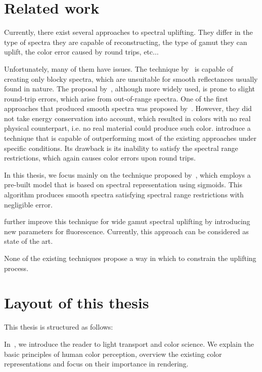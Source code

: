 \section*{Related work}

Currently, there exist several approaches to spectral uplifting. They differ in the type of spectra they are capable of reconstructing, the type of gamut they can uplift, the color error caused by round trips, etc$\ldots$

Unfortunately, many of them have issues. The technique by~\citet{upsamplingMacAdam} is capable of creating only blocky spectra, which are unsuitable for smooth reflectances usually found in nature. The proposal by~\citet{upsamplingSmits}, although more widely used, is prone to slight round-trip errors, which arise from out-of-range spectra. One of the first approaches that produced smooth spectra was proposed by~\citet{upsamplingMeng}. However, they did not take energy conservation into account, which resulted in colors with no real physical counterpart, i.e. no real material could produce such color. \citet{upsamplingOtsu} introduce a technique that is capable of outperforming most of the existing approaches under specific conditions. Its drawback is its inability to satisfy the spectral range restrictions, which again causes color errors upon round trips.

In this thesis, we focus mainly on the technique proposed by~\citet{upsamplingJakobHanika}, which employs a pre-built model that is based on spectral representation using sigmoids. This algorithm produces smooth spectra satisfying spectral range restrictions with negligible error.

\citet{upsamplingFluorescence} further improve this technique for wide gamut spectral uplifting by introducing new parameters for fluorescence. Currently, this approach can be considered as state of the art.

None of the existing techniques propose a way in which to constrain the uplifting process.

\section*{Layout of this thesis}

This thesis is structured as follows:

In~, we introduce the reader to light transport and color science. We explain the basic principles of human color perception, overview the existing color representations and focus on their importance in rendering.


